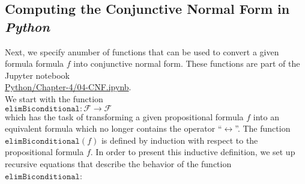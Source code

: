 \subsection{Computing the Conjunctive Normal Form in \textsl{Python}}
Next, we specify anumber of functions that can be used to convert a given formula
formula $f$ into conjunctive normal form.  These functions are part of the Jupyter notebook
\\[0.2cm]
\hspace*{1.3cm}
\href{https://github.com/karlstroetmann/Logic/blob/master/Python/Chapter-4/04-CNF.ipynb}{Python/Chapter-4/04-CNF.ipynb}.
\\[0.2cm]
We start with the
function 
\\[0.2cm]
\hspace*{1.3cm}
$\texttt{elimBiconditional}: \mathcal{F} \rightarrow \mathcal{F}$
\\[0.2cm]
which has the task of transforming a given propositional formula $f$ into an equivalent formula
which no longer contains the operator ``$\leftrightarrow$''.  The function
$\texttt{elimBiconditional}(f)$ is defined by induction with respect to the propositional formula $f$.
In order to present this inductive definition, we set up recursive equations
that describe the behavior of the function $\texttt{elimBiconditional}$:
